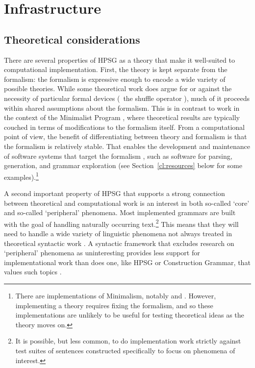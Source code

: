 \documentclass[output=paper,nonflat]{langsci/langscibook}
\begin{document}
\section{Infrastructure}
\label{cl:infrastructure}

\subsection{Theoretical considerations}
\label{cl:theoretical}

There are several properties of HPSG as a theory that make it well-suited to computational implementation.
First, the theory is kept separate from the formalism:
the formalism is expressive enough to encode a wide variety of possible theories.
While some theoretical work does argue for or against the necessity of particular formal devices
(\eg\ the shuffle operator \citep{Reape94a}),
much of it proceeds within shared assumptions about the formalism.
This is in contrast to work in the context of the Minimalist Program \citep{Chomsky93b-u},
where theoretical results are typically couched in terms of modifications to the formalism itself.
From a computational point of view, the benefit of differentiating between theory and formalism
is that the formalism is relatively stable.
That enables the development and maintenance of software systems that target the formalism \citep{boguraev1988software},
such as software for parsing, generation, and grammar exploration
(see Section~\ref{cl:resources} below for some examples).\footnote{%
	There are implementations of Minimalism, notably \citealt{Stabler97a-u} and \citealt{Herring:16}.
	However, implementing a theory requires fixing the formalism,
	and so these implementations are unlikely to be useful for testing theoretical ideas as the theory moves on.
}

A second important property of HPSG that supports a strong connection between theoretical and computational work is an interest in both so-called `core' and so-called `peripheral' phenomena. Most implemented grammars are built with the goal of handling naturally occurring text.\footnote{It is possible, but less common, to do implementation work strictly against test suites of sentences constructed specifically to focus on phenomena of interest.} This means that they will need to handle a wide variety of linguistic phenomena not always treated in theoretical syntactic work \citep{Baldwin-et-al-05}. A syntactic framework that excludes research on `peripheral' phenomena as uninteresting provides less support for implementational work than does one, like HPSG or Construction Grammar, that values such topics
.
\end{document}
